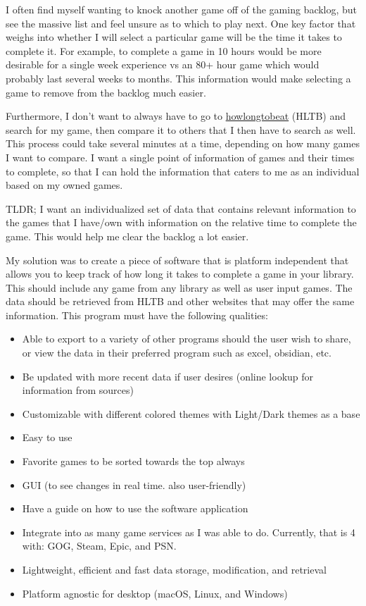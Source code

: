 I often find myself wanting to knock another game off of the gaming
backlog, but see the massive list and feel unsure as to which to play
next. One key factor that weighs into whether I will select a
particular game will be the time it takes to complete it. For
example, to complete a game in 10 hours would be more desirable for a
single week experience vs an 80+ hour game which would probably last
several weeks to months. This information would make selecting a game
to remove from the backlog much easier.

Furthermore, I don't want to always have to go to
\href{https://howlongtobeat.com/}{howlongtobeat} (HLTB) and search for my game,
then compare it to others that I then have to search as well. This
process could take several minutes at a time, depending on how many
games I want to compare. I want a single point of information of
games and their times to complete, so that I can hold the information
that caters to me as an individual based on my owned games.

TLDR;
I want an individualized set of data that contains relevant
information to the games that I have/own with information on the
relative time to complete the game. This would help me clear
the backlog a lot easier.

My solution was to create a piece of software that is platform
independent that allows you to keep track of how long it takes to
complete a game in your library. This should include any game from
any library as well as user input games. The data should be retrieved
from HLTB and other websites that may offer the same information.
This program must have the following qualities:

\begin{itemize}
	\item Able to export to a variety of other programs should the user
		wish to share, or view the data in their preferred program such as
		excel, obsidian, etc.
	\item Be updated with more recent data if user desires (online
		lookup for information from sources)
	\item Customizable with different colored themes with Light/Dark
		themes as a base
	\item Easy to use
	\item Favorite games to be sorted towards the top always
	\item GUI (to see changes in real time. also user-friendly)
	\item Have a guide on how to use the software application
	\item Integrate into as many game services as I was able to do.
		Currently, that is 4 with: GOG, Steam, Epic, and PSN.
	\item Lightweight, efficient and fast data storage, modification, and retrieval
	\item Platform agnostic for desktop (macOS, Linux, and Windows)
\end{itemize}

